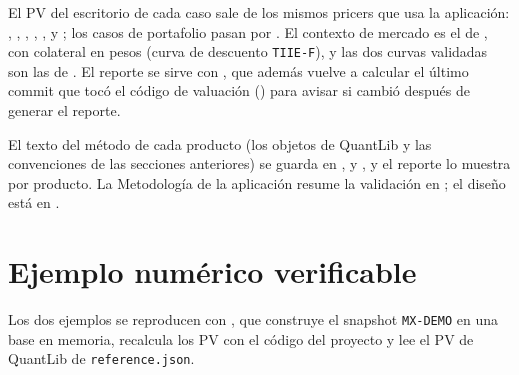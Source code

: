 El PV del escritorio de cada caso sale de los mismos pricers que usa la aplicación:
, ,
, ,
,  y
; los casos de portafolio pasan por
. El contexto de mercado es el de
, con colateral en pesos (curva de descuento \texttt{TIIE-F}), y las dos curvas
validadas son las de . El reporte se sirve con
, que además vuelve a calcular el último commit que tocó el código de
valuación () para avisar si cambió después de generar el reporte.

El texto del método de cada producto (los objetos de QuantLib y las convenciones de las secciones anteriores) se guarda en
,  y
, y el reporte lo muestra por producto. La Metodología de la aplicación resume la
validación en ; el diseño está en
.

\section{Ejemplo numérico verificable}\label{sec:cap12-ejemplo}

Los dos ejemplos se reproducen con , que construye
el snapshot \texttt{MX-DEMO} en una base en memoria, recalcula los PV con el código del proyecto y lee el PV de QuantLib
de \texttt{reference.json}.

